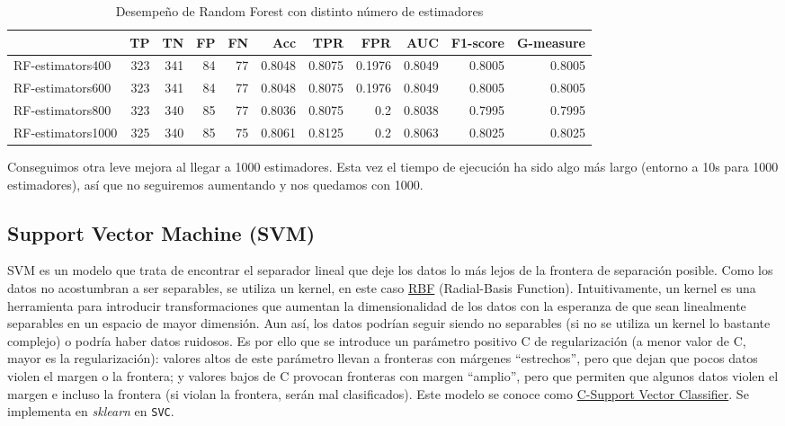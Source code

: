 \documentclass{article}
\begin{document}
\begin{table}[H]
\centering
\caption{Desempeño de Random Forest con distinto número de estimadores}
\label{tab:tuning-rf}
\begin{tabular}{|lrrrrrrrrrr|}
\hline
 & TP & TN & FP & FN & Acc & TPR & FPR & AUC & F1-score & G-measure\\ \hline
RF-estimators400 & 323 & 341 & 84 & 77 & 0.8048 & 0.8075 & 0.1976 & 0.8049 & 0.8005 & 0.8005\\
RF-estimators600 & 323 & 341 & 84 & 77 & 0.8048 & 0.8075 & 0.1976 & 0.8049 & 0.8005 & 0.8005\\
RF-estimators800 & 323 & 340 & 85 & 77 & 0.8036 & 0.8075 & 0.2 & 0.8038 & 0.7995 & 0.7995\\
RF-estimators1000 & 325 & 340 & 85 & 75 & 0.8061 & 0.8125 & 0.2 & 0.8063 & 0.8025 & 0.8025\\
\hline
\end{tabular}
\end{table}

Conseguimos otra leve mejora al llegar a 1000 estimadores. Esta vez el
tiempo de ejecución ha sido algo más largo (entorno a 10s para 1000
estimadores), así que no seguiremos aumentando y nos quedamos con
1000.

\subsection{Support Vector Machine (SVM)}

SVM es un modelo que trata de encontrar el separador lineal que deje
los datos lo más lejos de la frontera de separación posible. Como los
datos no acostumbran a ser separables, se utiliza un kernel, en este
caso
\href{https://scikit-learn.org/stable/modules/generated/sklearn.gaussian_process.kernels.RBF.html}{RBF}
(Radial-Basis Function). Intuitivamente, un kernel es una herramienta
para introducir transformaciones que aumentan la dimensionalidad de
los datos con la esperanza de que sean linealmente separables en un
espacio de mayor dimensión. Aun así, los datos podrían seguir siendo
no separables (si no se utiliza un kernel lo bastante complejo) o
podría haber datos ruidosos. Es por ello que se introduce un parámetro
positivo C de regularización (a menor valor de C, mayor es la
regularización): valores altos de este parámetro llevan a fronteras
con márgenes ``estrechos'', pero que dejan que pocos datos violen el
margen o la frontera; y valores bajos de C provocan fronteras con
margen ``amplio'', pero que permiten que algunos datos violen el
margen e incluso la frontera (si violan la frontera, serán mal
clasificados). Este modelo se conoce como
\href{https://medium.com/@pushkarmandot/what-is-the-significance-of-c-value-in-support-vector-machine-28224e852c5a}{C-Support
  Vector Classifier}. Se implementa en \textit{sklearn} en
\texttt{SVC}.
\end{document}
